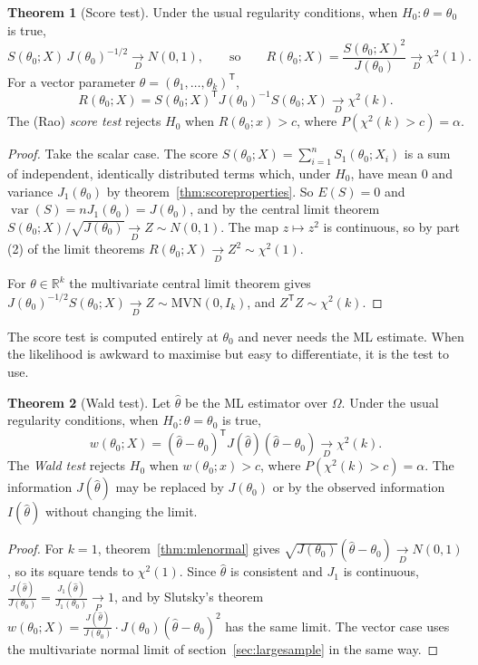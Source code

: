 \documentclass[12pt,a4paper]{report}
\theoremstyle{definition}
\newtheorem{thm}{Theorem}[section]
\DeclareMathOperator{\var}{var}
\begin{document}
\begin{thm}[Score test]
\label{thm:scoretest}
Under the usual regularity conditions, when $H_0\colon\theta = \theta_0$ is true,
\[S(\theta_0; X)\,J(\theta_0)^{-1/2}\underset{D}{\longrightarrow}N(0, 1),\qquad\text{so}\qquad
R(\theta_0; X) = \frac{S(\theta_0; X)^2}{J(\theta_0)}\underset{D}{\longrightarrow}\chi^2(1) .\]
For a vector parameter $\theta = (\theta_1, \dots, \theta_k)^{\mathsf T}$,
\[R(\theta_0; X) = S(\theta_0; X)^{\mathsf T}J(\theta_0)^{-1}S(\theta_0; X)\underset{D}{\longrightarrow}\chi^2(k) .\]
The (Rao) \emph{score test} rejects $H_0$ when $R(\theta_0; x)>c$, where
$P\left(\chi^2(k)>c\right) = \alpha$.
\end{thm}

\begin{proof}
Take the scalar case. The score $S(\theta_0; X) = \sum_{i=1}^nS_1(\theta_0; X_i)$ is a sum of
independent, identically distributed terms which, under $H_0$, have mean $0$ and
variance $J_1(\theta_0)$ by theorem~\ref{thm:scoreproperties}. So $E(S) = 0$ and
$\var(S) = nJ_1(\theta_0) = J(\theta_0)$, and by the central limit theorem
$S(\theta_0; X)/\sqrt{J(\theta_0)}\underset{D}{\longrightarrow}Z\sim N(0, 1)$. The map
$z\mapsto z^2$ is continuous, so by part (2) of the limit theorems
$R(\theta_0; X)\underset{D}{\longrightarrow}Z^2\sim\chi^2(1)$.

For $\theta\in\mathbb{R}^k$ the multivariate central limit theorem gives
$J(\theta_0)^{-1/2}S(\theta_0; X)\underset{D}{\longrightarrow}Z\sim\text{MVN}(0, I_k)$, and
$Z^{\mathsf T}Z\sim\chi^2(k)$.
\end{proof}

The score test is computed entirely at $\theta_0$ and never needs the ML estimate.
When the likelihood is awkward to maximise but easy to differentiate, it is the test
to use.

\begin{thm}[Wald test]
\label{thm:waldtest}
Let $\hat\theta$ be the ML estimator over $\Omega$. Under the usual regularity conditions,
when $H_0\colon\theta = \theta_0$ is true,
\[w(\theta_0; X) = (\hat\theta - \theta_0)^{\mathsf T}J(\hat\theta)(\hat\theta - \theta_0)\underset{D}{\longrightarrow}\chi^2(k) .\]
The \emph{Wald test} rejects $H_0$ when $w(\theta_0; x)>c$, where
$P\left(\chi^2(k)>c\right) = \alpha$. The information $J(\hat\theta)$ may be replaced by
$J(\theta_0)$ or by the observed information $I(\hat\theta)$ without changing the limit.
\end{thm}

\begin{proof}
For $k = 1$, theorem~\ref{thm:mlenormal} gives
$\sqrt{J(\theta_0)}(\hat\theta - \theta_0)\underset{D}{\longrightarrow}N(0, 1)$, so its square tends to
$\chi^2(1)$. Since $\hat\theta$ is consistent and $J_1$ is continuous,
$\frac{J(\hat\theta)}{J(\theta_0)} = \frac{J_1(\hat\theta)}{J_1(\theta_0)}\underset{P}{\longrightarrow}1$, and by Slutsky's
theorem $w(\theta_0; X) = \frac{J(\hat\theta)}{J(\theta_0)}\cdot J(\theta_0)(\hat\theta - \theta_0)^2$ has the same
limit. The vector case uses the multivariate normal limit of
section~\ref{sec:largesample} in the same way.
\end{proof}
\end{document}
